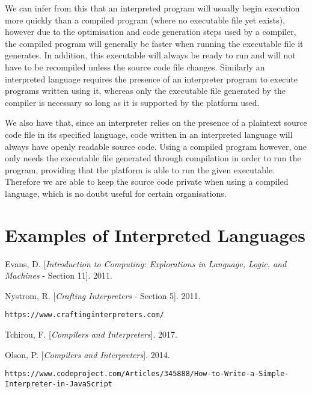 \documentclass[a4paper, 11pt]{article}
\begin{document}
We can infer from this that an interpreted program will usually begin execution more quickly than a compiled program (where no executable file yet exists), however due to the optimisation and code generation steps used by a compiler, the compiled program will generally be faster when running the executable file it generates. In addition, this executable will always be ready to run and will not have to be recompiled unless the source code file changes. Similarly an interpreted language requires the presence of an interpreter program to execute programs written using it, whereas only the executable file generated by the compiler is necessary so long as it is supported by the platform used.

We also have that, since an interpreter relies on the presence of a plaintext source code file in its specified language, code written in an interpreted language will always have openly readable source code. Using a compiled program however, one only needs the executable file generated through compilation in order to run the program, providing that the platform is able to run the given executable. Therefore we are able to keep the source code private when using a compiled language, which is no doubt useful for certain organisations.

\section{Examples of Interpreted Languages}

\newpage
{}
\begin{thebibliography}{9}

Evans, D.
[\textit{Introduction to Computing: Explorations in Language, Logic, and Machines} - Section 11]. 
2011.

Nystrom, R.
[\textit{Crafting Interpreters} - Section 5]. 
2011.

\texttt{https://www.craftinginterpreters.com/}

Tchirou, F.
[\textit{Compilers and Interpreters}]. 
2017.

Olson, P.
[\textit{Compilers and Interpreters}]. 
2014.

\texttt{https://www.codeproject.com/Articles/345888/How-to-Write-a-Simple-Interpreter-in-JavaScript}

\end{thebibliography}
\end{document}
